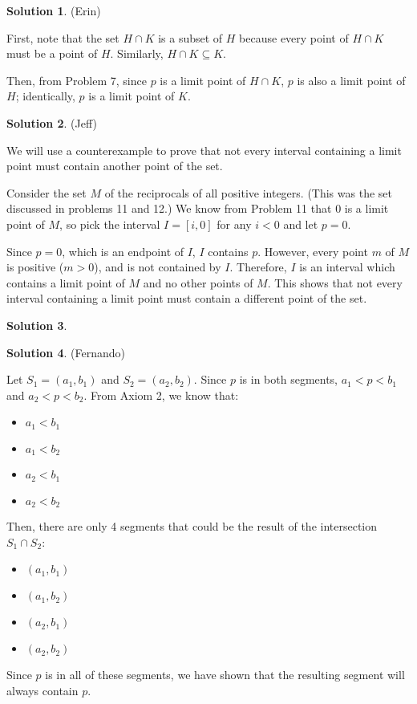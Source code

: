 \documentclass{article}
\theoremstyle{definition}
\newtheorem{solution}{Solution}
\begin{document}
\begin{solution} %
(Erin)

First, note that the set $H \cap K$ is a subset of $H$ because every point of $H \cap K$ must be a point of $H$.
Similarly, $H \cap K \subseteq K$.

Then, from Problem 7, since $p$ is a limit point of $H \cap K$, $p$ is also a limit point of $H$; identically, $p$ is a limit point of $K$.
\end{solution}

\begin{solution} %
(Jeff)

We will use a counterexample to prove that not every interval containing a limit point must contain another point of the set.

Consider the set $M$ of the reciprocals of all positive integers.
(This was the set discussed in problems 11 and 12.)
We know from Problem 11 that $0$ is a limit point of $M$, so pick the interval $I = [i, 0]$ for any $i < 0$ and let $p = 0$.

Since $p = 0$, which is an endpoint of $I$, $I$ contains $p$.
However, every point $m$ of $M$ is positive ($m > 0$), and is not contained by $I$.
Therefore, $I$ is an interval which contains a limit point of $M$ and no other points of $M$.
This shows that not every interval containing a limit point must contain a different point of the set.
\end{solution}

\begin{solution} %
\end{solution}

\begin{solution} %
(Fernando)

Let $S_1 = (a_1, b_1)$ and $S_2 = (a_2, b_2)$.
Since $p$ is in both segments, $a_1 < p < b_1$ and $a_2 < p < b_2$.
From Axiom 2, we know that:

\begin{itemize}
\item $a_1 < b_1$
\item $a_1 < b_2$
\item $a_2 < b_1$
\item $a_2 < b_2$
\end{itemize}

Then, there are only 4 segments that could be the result of the intersection $S_1 \cap S_2$:

\begin{itemize}
\item $(a_1, b_1)$
\item $(a_1, b_2)$
\item $(a_2, b_1)$
\item $(a_2, b_2)$
\end{itemize}

Since $p$ is in all of these segments, we have shown that the resulting segment will always contain $p$.
\end{solution}
\end{document}
